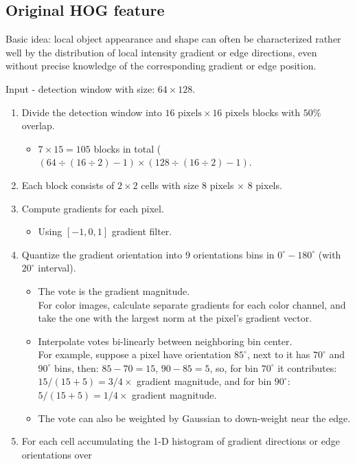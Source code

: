 \documentclass[12pt]{article}
\numberwithin{equation}{section}
\begin{document}
\subsection{Original HOG feature  \cite{dalal2005histograms} } \label{ch:hog}
Basic idea: local object appearance and shape can often be characterized rather well
by the distribution of local intensity gradient or edge directions, even without precise knowledge
of the corresponding gradient or edge position. \par
Input - detection window with size: $64 \times 128$. 
\begin{enumerate}
	\item Divide the detection window into $16 \text{ pixels} \times 16 \text{ pixels}$ blocks with $50\%$ overlap.
		\begin{itemize}
			\item $7 \times 15 = 105$ blocks in total ($(64 \div (16 \div 2) - 1) \times 
				(128 \div (16 \div 2) - 1)$. 
		\end{itemize}
	\item Each block consists of $2 \times 2$ cells with size 8 pixels $ \times $ 8 pixels.
	\item Compute gradients for each pixel.
		\begin{itemize}
			\item Using $[-1, 0, 1]$ gradient filter.
		\end{itemize}
	\item Quantize the gradient orientation into 9 orientations bins in $0^\circ-180^\circ$
	(with $20^\circ$ interval).
		\begin{itemize}
			\item The vote is the gradient magnitude. \\
			For color images, calculate separate gradients for each color channel, and take the one with 
			the largest norm at the pixel's gradient vector.
			\item Interpolate votes bi-linearly between neighboring bin center. \\
			 For example, suppose a pixel have orientation $85^\circ$, next to it has $70^\circ$ and 
			 $90^\circ$ bins, then: $85-70=15$, $90-85=5$, so, for bin $70^\circ$ it contributes:
			  $15/(15+5)=3/4 \times$ gradient magnitude, and for bin $90^\circ$: $5/(15+5)=1/4 \times$
			  gradient magnitude.
			\item The vote can also be weighted by Gaussian to down-weight near the edge.
		\end{itemize}
	\item For each cell accumulating the 1-D histogram of gradient directions or edge orientations over

\end{enumerate}
\end{document}
